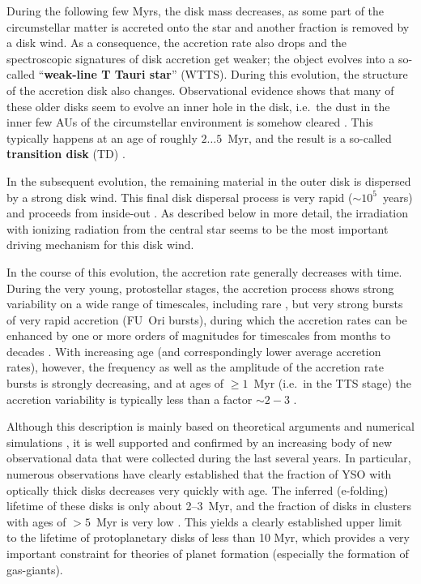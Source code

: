 \documentclass[10pt,fleqn,twoside]{article}
\begin{document}
\smallskip

During the following few Myrs, the disk mass decreases, as some part of
the circumstellar matter is accreted onto the star and another fraction
is removed by a disk wind.
As a consequence, the accretion rate also drops and the spectroscopic 
signatures of disk accretion get weaker; 
the object evolves into a so-called    ``\textbf{weak-line T Tauri star}''
(WTTS).
During this evolution, the structure of the accretion disk also changes.
Observational evidence  shows that many of these older disks 
seem to evolve an inner hole in the disk, i.e.~the dust in the inner few AUs of the
circumstellar environment is somehow cleared \citep[e.g.,][]{Alexander14,Koepferl13}.
This typically happens at an age of roughly $ 2 \dots 5$~Myr, and
the result is a so-called \textbf{transition disk} (TD)
\citep[see][]{Owen16}.
\smallskip

In the subsequent evolution, the remaining material in the outer
disk is dispersed by a strong disk wind.
This final disk dispersal process is very rapid ($\sim 10^5$~years)
and proceeds from inside-out \citep{Ercolano14}. As described below in more detail,
the irradiation with ionizing radiation from the central star seems to be
the most important driving mechanism for this disk wind.

\medskip

In the course of this  evolution, the accretion rate generally decreases with time. 
During the very young, protostellar stages,
the accretion process shows strong
 variability on a wide range of timescales, including rare \citep[see][]{HF15}, 
but very strong
bursts of very rapid accretion (FU~Ori bursts), during
which the accretion rates
can be enhanced  by one or more orders of magnitudes for timescales
from months to decades
\citep[see][and the illustration in Fig.~\ref{hartmann.fig}]{Hartmann16}.
%
With increasing age (and correspondingly lower average accretion rates),
however,
the frequency as well as the amplitude of the accretion rate
bursts is strongly decreasing, and at ages of $\ge 1$~Myr (i.e.~in the
TTS stage) the accretion variability is typically less than a factor $\sim 2-3$
\citep[see][]{Venuti14}.




\medskip

Although this description is mainly based on theoretical arguments and
numerical simulations \citep{Ercolano11,Alexander14}, it is well supported and confirmed by an
increasing body of new observational 
data that were collected during the last several years. 
%
In particular, numerous observations have clearly established that
the fraction of YSO with optically thick disks decreases very
quickly with age. The inferred (e-folding) lifetime of these disks
is only about 2--3~Myr, and the fraction of disks in clusters 
with  ages of $> 5$~Myr is very low \citep[e.g.,][]{Hernandez07}. This yields a clearly
established upper limit to the lifetime of protoplanetary disks of
 less than 10 Myr, which provides 
a very important constraint for theories of planet formation
(especially the formation of gas-giants).
\end{document}
